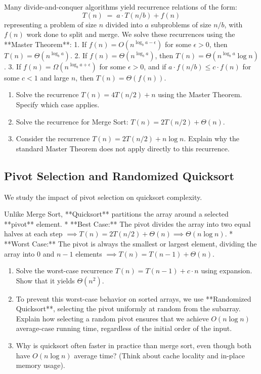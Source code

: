 \documentclass[12pt, a4paper]{book}
\begin{document}
\begin{explobox}
Many divide-and-conquer algorithms yield recurrence relations of the form:
\[
  T(n) \;=\; a \cdot T(n/b) + f(n)
\]
representing a problem of size $n$ divided into $a$ subproblems of size $n/b$, with $f(n)$ work done to split and merge.
We solve these recurrences using the **Master Theorem**:
1. If $f(n) = O(n^{\log_b a - \epsilon})$ for some $\epsilon > 0$, then $T(n) = \Theta(n^{\log_b a})$.
2. If $f(n) = \Theta(n^{\log_b a})$, then $T(n) = \Theta(n^{\log_b a} \log n)$.
3. If $f(n) = \Omega(n^{\log_b a + \epsilon})$ for some $\epsilon > 0$, and if $a \cdot f(n/b) \le c \cdot f(n)$ for some $c < 1$ and large $n$, then $T(n) = \Theta(f(n))$.
\begin{enumerate}[label=(\alph*), leftmargin=*]
  \item Solve the recurrence $T(n) = 4 T(n/2) + n$ using the Master Theorem. Specify which case applies.
  \item Solve the recurrence for Merge Sort: $T(n) = 2 T(n/2) + \Theta(n)$.
  \item Consider the recurrence $T(n) = 2 T(n/2) + n \log n$.
        Explain why the standard Master Theorem does not apply directly to this recurrence.
\end{enumerate}
\end{explobox}

\subsection{Pivot Selection and Randomized Quicksort}

We study the impact of pivot selection on quicksort complexity.

\begin{explobox}
Unlike Merge Sort, **Quicksort** partitions the array around a selected **pivot** element.
* **Best Case:** The pivot divides the array into two equal halves at each step $\implies T(n) = 2 T(n/2) + \Theta(n) \implies \Theta(n \log n)$.
* **Worst Case:** The pivot is always the smallest or largest element, dividing the array into $0$ and $n-1$ elements $\implies T(n) = T(n-1) + \Theta(n)$.
\begin{enumerate}[label=(\alph*), leftmargin=*]
  \item Solve the worst-case recurrence $T(n) = T(n-1) + c \cdot n$ using expansion. Show that it yields $\Theta(n^2)$.
  \item To prevent this worst-case behavior on sorted arrays, we use **Randomized Quicksort**, selecting the pivot uniformly at random from the subarray.
        Explain how selecting a random pivot ensures that we achieve $O(n \log n)$ average-case running time, regardless of the initial order of the input.
  \item Why is quicksort often faster in practice than merge sort, even though both have $O(n \log n)$ average time? (Think about cache locality and in-place memory usage).
\end{enumerate}
\end{explobox}
\end{document}
